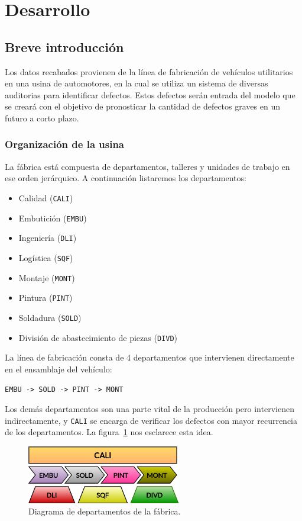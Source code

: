 \documentclass[a4paper,12pt]{article}
\begin{document}
		\section{Desarrollo}
		
		\subsection{Breve introducción}
		Los datos recabados provienen de la línea de fabricación de vehículos utilitarios en una usina de automotores, en la cual se utiliza un sistema de diversas auditorias para identificar defectos. Estos defectos serán entrada del modelo que se creará con el objetivo de pronosticar la cantidad de defectos graves en un futuro a corto plazo.
		
		\subsubsection{Organización de la usina}
		La fábrica está compuesta de departamentos, talleres y unidades de trabajo en ese orden jerárquico. A continuación listaremos los departamentos:
		
		\begin{itemize}[noitemsep, topsep=2pt]
			\item Calidad (\texttt{CALI})
			\item Embutición (\texttt{EMBU})
			\item Ingeniería (\texttt{DLI})
			\item Logística (\texttt{SQF})
			\item Montaje (\texttt{MONT})
			\item Pintura (\texttt{PINT})
			\item Soldadura (\texttt{SOLD})
			\item División de abastecimiento de piezas (\texttt{DIVD})
		\end{itemize}
		
		La línea de fabricación consta de 4 departamentos que intervienen directamente en el ensamblaje del vehículo:
		
		\texttt{EMBU -> SOLD -> PINT -> MONT}
		
		Los demás departamentos son una parte vital de la producción pero intervienen indirectamente, y \texttt{CALI} se encarga de verificar los defectos con mayor recurrencia de los departamentos. La figura~\ref{fig:dptodiagram} nos esclarece esta idea.
		
		\begin{figure}[H]
			\begin{center}				
				\includegraphics[width=0.6\textwidth]{usina.png}
				\caption{Diagrama de departamentos de la fábrica.}
				\label{fig:dptodiagram}
			\end{center}
		\end{figure}
		
\end{document}
